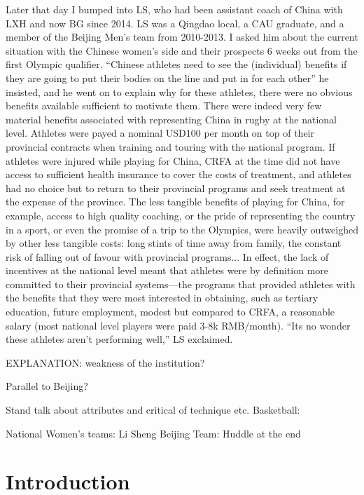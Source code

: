 Later that day I bumped into LS, who had been assistant coach of China with LXH and now BG since 2014.  LS was a Qingdao local, a CAU graduate, and a member of the Beijing Men's team from 2010-2013.  I asked him about the current situation with the Chinese women's side and their prospects 6 weeks out from the first Olympic qualifier.  ``Chinese athletes need to see the (individual) benefits if they are going to put their bodies on the line and put in for each other'' he insisted, and he went on to explain why for these athletes, there were no obvious benefits available sufficient to motivate them.  There were indeed very few material benefits associated with representing China in rugby at the national level.  Athletes were payed a nominal USD100 per month on top of their provincial contracts when training and touring with the national program.  If athletes were injured while playing for China, CRFA at the time did not have access to sufficient health insurance to cover the costs of treatment, and athletes had no choice but to return to their provincial programs and seek treatment at the expense of the province.  The less tangible benefits of playing for China, for example, access to high quality coaching, or the pride of representing the country in a sport, or even the promise of a trip to the Olympics, were heavily outweighed by other less tangible costs: long stints of time away from family, the constant risk of falling out of favour with provincial programs...  In effect, the lack of incentives at the national level meant that athletes were by definition more committed to their provincial systems---the programs that provided athletes with the benefits that they were most interested in obtaining, such as tertiary education, future employment, modest but compared to CRFA, a reasonable salary (most national level players were paid 3-8k RMB/month). ``Its no wonder these athletes aren't performing well,'' LS exclaimed.

EXPLANATION: weakness of the institution?

Parallel to Beijing?


Stand talk about attributes and critical of technique etc.
Basketball:



National Women's teams: Li Sheng
Beijing Team: Huddle at the end




\section{Introduction}


